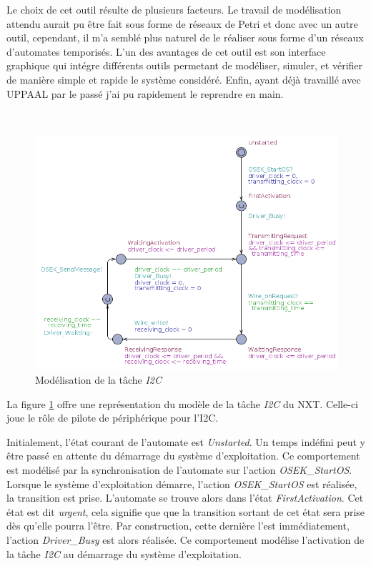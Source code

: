       Le choix de cet outil résulte de plusieurs facteurs.  Le travail de
      modélisation attendu aurait pu être fait sous forme de réseaux de Petri et
      donc avec un autre outil, cependant, il m'a semblé plus naturel de le
      réaliser sous forme d'un réseaux d'automates temporisés. L'un des
      avantages de cet outil est son interface graphique qui intégre différents
      outils permetant de modéliser, simuler, et vérifier de manière simple et
      rapide le système considéré. Enfin, ayant déjà travaillé avec UPPAAL par
      le passé j'ai pu rapidement le reprendre en main.

      ~

      \begin{figure}[!ht]
        \centering
        \includegraphics[scale=0.5]{./img/uppaal-driver.png}
        \caption{Modélisation de la tâche {\it I2C}}
        \label{uppaal-driver}
      \end{figure}
      
      
      La figure \ref{uppaal-driver} offre une représentation du modèle de la
      tâche {\it I2C} du NXT. Celle-ci joue le rôle de pilote de périphérique
      pour l'I2C.
      
      Initialement, l'état courant de
      l'automate est {\it Unstarted}. Un temps indéfini peut y être passé en
      attente du démarrage du système d'exploitation. Ce comportement est
      modélisé par la synchronisation de l'automate sur l'action
      {\it OSEK\_StartOS}. Lorsque le système d'exploitation démarre, l'action
      {\it OSEK\_StartOS} est réalisée, la transition est prise. L'automate
      se trouve alors dans l'état {\it FirstActivation}. Cet état est dit
      {\it urgent}, cela signifie que que la transition sortant de cet état
      sera prise dès qu'elle pourra l'être. Par construction, cette dernière l'est
      immédiatement, l'action {\it Driver\_Busy} est alors réalisée.
      Ce comportement modélise l'activation de la tâche {\it I2C} au démarrage
      du système d'exploitation.
      
